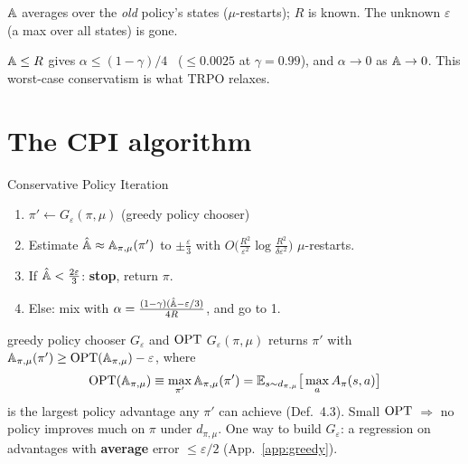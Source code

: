 \begin{pair}
\begin{keybox}[title={Computable}]
$\mathbb{A}$ averages over the \emph{old} policy's states ($\mu$-restarts); $R$ is known. The unknown $\varepsilon$ (a max over all states) is gone.
\end{keybox}
\begin{warnbox}[title={Tiny steps}]
$\mathbb{A}\le R$ gives $\alpha\le(1-\gamma)/4$ \ (${}\le0.0025$ at $\gamma=0.99$), and $\alpha\to0$ as $\mathbb{A}\to0$. This worst-case conservatism is what TRPO relaxes.
\end{warnbox}
\end{pair}

\section{The CPI algorithm}
\label{sec:cpi-alg}

\begin{algbox}{Conservative Policy Iteration}
\begin{enumerate}
  \item $\pi' \leftarrow G_\varepsilon(\pi,\mu)$ \hfill {\small(greedy policy chooser)}
  \item Estimate $\hat{\mathbb{A}} \approx \mathbb{A}_{\pi,\mu}(\pi')$ to $\pm\frac\varepsilon3$ with $O\big(\frac{R^2}{\varepsilon^2}\log\frac{R^2}{\delta\varepsilon^2}\big)$ $\mu$-restarts.
  \item If $\hat{\mathbb{A}} < \frac{2\varepsilon}{3}$: \textbf{stop}, return $\pi$.
  \item Else: mix with $\alpha = \frac{(1-\gamma)(\hat{\mathbb{A}} - \varepsilon/3)}{4R}$, and go to 1.
\end{enumerate}
\end{algbox}

\begin{defbox}{greedy policy chooser $G_\varepsilon$ and $\mathrm{OPT}$}
$G_\varepsilon(\pi,\mu)$ returns $\pi'$ with $\mathbb{A}_{\pi,\mu}(\pi') \ge \mathrm{OPT}(\mathbb{A}_{\pi,\mu}) - \varepsilon$, where
\begin{gather*}
  \mathrm{OPT}(\mathbb{A}_{\pi,\mu}) \equiv \max_{\pi'}\mathbb{A}_{\pi,\mu}(\pi') = \mathbb{E}_{s\sim d_{\pi,\mu}}\big[\max_a A_\pi(s,a)\big]
\end{gather*}
is the largest policy advantage any $\pi'$ can achieve (Def.~4.3). Small $\mathrm{OPT}$ $\Rightarrow$ no policy improves much on $\pi$ under $d_{\pi,\mu}$. One way to build $G_\varepsilon$: a regression on advantages with \textbf{average} error $\le\varepsilon/2$ (App.~\ref{app:greedy}).
\end{defbox}

